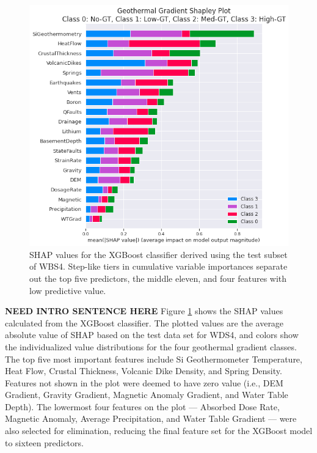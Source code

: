 \begin{figure}[htp]
\centering
\includegraphics[width=\textwidth]{templates/images/Figure-Shapley.png}
\caption[XGBoost SHAP values]{SHAP values for the XGBoost classifier derived using the test subset of WBS4. Step-like tiers in cumulative variable importances separate out the top five predictors, the middle eleven, and four features with low predictive value.}
\label{fig:xgb_shap_global}
\end{figure}

\textbf{NEED INTRO SENTENCE HERE}
Figure \ref{fig:xgb_shap_global} shows the SHAP values calculated from the XGBoost classifier. The plotted values are the average absolute value of SHAP based on the test data set for WDS4, and colors show the individualized value distributions for the four geothermal gradient classes. The top five most important features include Si Geothermometer Temperature, Heat Flow, Crustal Thickness, Volcanic Dike Density, and Spring Density.  Features not shown in the plot were deemed to have zero value (i.e., DEM Gradient, Gravity Gradient, Magnetic Anomaly Gradient, and Water Table Depth). The lowermost four features on the plot --- Absorbed Dose Rate, Magnetic Anomaly, Average Precipitation, and Water Table Gradient --- were also selected for elimination, reducing the final feature set for the XGBoost model to sixteen predictors.

